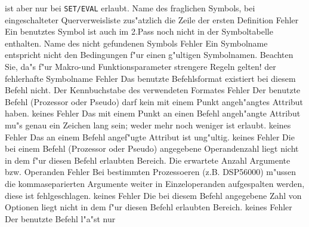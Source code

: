\documentclass[12pt,a4paper,twoside]{report}
\newcommand{\tty}[1]{{\tt #1}}
\begin{document}
\begin{description}
{                ist aber nur bei \tty{SET/EVAL} erlaubt.}
               {Name des fraglichen Symbols, bei eingeschalteter
	        Querverweisliste zus"atzlich die Zeile der ersten Definition}
               {Fehler}
               {Ein benutztes Symbol ist auch im 2.Pass noch
                nicht in der Symboltabelle enthalten.}
               {Name des nicht gefundenen Symbols}
               {Fehler}
               {Ein Symbolname entspricht nicht den Bedingungen
                f"ur einen g"ultigen Symbolnamen.  Beachten Sie, da"s f"ur
                Makro-und Funktionsparameter strengere Regeln gelten!}
               {der fehlerhafte Symbolname}
               {Fehler}
               {Das benutzte Befehlsformat existiert bei diesem
                Befehl nicht.}
               {Der Kennbuchstabe des verwendeten Formates}
               {Fehler}
               {Der benutzte Befehl (Prozessor oder Pseudo) darf
                kein mit einem Punkt angeh"angtes Attribut haben.}
               {keines}
               {Fehler}
               {Das mit einem Punkt an einen Befehl angeh"angte
                Attribut mu"s genau ein Zeichen lang sein; weder mehr noch
                weniger ist erlaubt.}
               {keines}
               {Fehler}
               {Das an einem Befehl angef"ugte Attribut ist ung"ultig.}
               {keines}
               {Fehler}
               {Die bei einem Befehl (Prozessor oder Pseudo)
                angegebene Operandenzahl liegt nicht in dem f"ur diesen
                Befehl erlaubten Bereich.}
               {Die erwartete Anzahl Argumente bzw. Operanden}
               {Fehler}
               {Bei bestimmten Prozessoeren (z.B. DSP56000)
                m"ussen die kommaseparierten Argumente weiter in
                Einzeloperanden aufgespalten werden, diese ist
                fehlgeschlagen.}
               {keines}
               {Fehler}
               {Die bei diesem Befehl angegebene Zahl
	        von Optionen liegt nicht in dem f"ur diesen
                Befehl erlaubten Bereich.}
               {keines}
               {Fehler}
               {Der benutzte Befehl l"a"st nur
}
\end{description}
\end{document}
